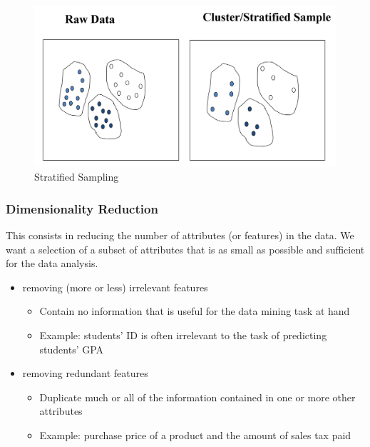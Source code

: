 \begin{figure}[htbp]
   \centering
   \includegraphics{images/01/stratifiedSampling.png}
   \caption{Stratified Sampling}
   \label{fig:01/stratifiedSampling}
\end{figure}

\subsubsection{Dimensionality Reduction}
This consists in reducing the number of attributes (or features) in the data.
We want a selection of a subset of attributes that is as small as possible and sufficient for the data analysis.
\begin{itemize}
	\item removing (more or less) irrelevant features
\begin{itemize}
	\item Contain no information that is useful for the data mining
task at hand
	\item Example: students' ID is often irrelevant to the task of
predicting students' GPA
\end{itemize}
	\item removing redundant features
\begin{itemize}
	\item Duplicate much or all of the information contained in one or
more other attributes
	\item Example: purchase price of a product and the amount of
sales tax paid
\end{itemize}
\end{itemize}

